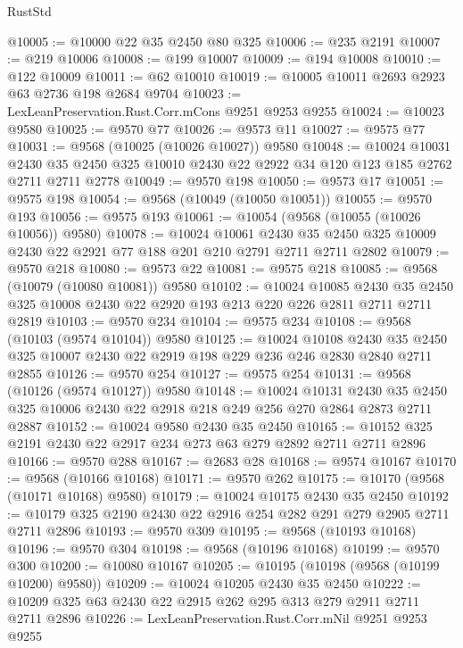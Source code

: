 \begin{lexlean}{RustStd}
\begin{coremodule}
@10005 := @10000 @22 @35 @2450 @80 @325
@10006 := @235 @2191
@10007 := @219 @10006
@10008 := @199 @10007
@10009 := @194 @10008
@10010 := @122 @10009
@10011 := @62 @10010
@10019 := @10005 @10011 @2693 @2923 @63 @2736 @198 @2684 @9704
@10023 := LexLeanPreservation.Rust.Corr.mCons @9251 @9253 @9255
@10024 := @10023 @9580
@10025 := @9570 @77
@10026 := @9573 @11
@10027 := @9575 @77
@10031 := @9568 (@10025 (@10026 @10027)) @9580
@10048 := @10024
    @10031
    @2430
    @35
    @2450
    @325
    @10010
    @2430
    @22
    @2922
    @34
    @120
    @123
    @185
    @2762
    @2711
    @2711
    @2778
@10049 := @9570 @198
@10050 := @9573 @17
@10051 := @9575 @198
@10054 := @9568 (@10049 (@10050 @10051))
@10055 := @9570 @193
@10056 := @9575 @193
@10061 := @10054 (@9568 (@10055 (@10026 @10056)) @9580)
@10078 := @10024
    @10061
    @2430
    @35
    @2450
    @325
    @10009
    @2430
    @22
    @2921
    @77
    @188
    @201
    @210
    @2791
    @2711
    @2711
    @2802
@10079 := @9570 @218
@10080 := @9573 @22
@10081 := @9575 @218
@10085 := @9568 (@10079 (@10080 @10081)) @9580
@10102 := @10024
    @10085
    @2430
    @35
    @2450
    @325
    @10008
    @2430
    @22
    @2920
    @193
    @213
    @220
    @226
    @2811
    @2711
    @2711
    @2819
@10103 := @9570 @234
@10104 := @9575 @234
@10108 := @9568 (@10103 (@9574 @10104)) @9580
@10125 := @10024
    @10108
    @2430
    @35
    @2450
    @325
    @10007
    @2430
    @22
    @2919
    @198
    @229
    @236
    @246
    @2830
    @2840
    @2711
    @2855
@10126 := @9570 @254
@10127 := @9575 @254
@10131 := @9568 (@10126 (@9574 @10127)) @9580
@10148 := @10024
    @10131
    @2430
    @35
    @2450
    @325
    @10006
    @2430
    @22
    @2918
    @218
    @249
    @256
    @270
    @2864
    @2873
    @2711
    @2887
@10152 := @10024 @9580 @2430 @35 @2450
@10165 := @10152 @325 @2191 @2430 @22 @2917 @234 @273 @63 @279 @2892 @2711 @2711 @2896
@10166 := @9570 @288
@10167 := @2683 @28
@10168 := @9574 @10167
@10170 := @9568 (@10166 @10168)
@10171 := @9570 @262
@10175 := @10170 (@9568 (@10171 @10168) @9580)
@10179 := @10024 @10175 @2430 @35 @2450
@10192 := @10179 @325 @2190 @2430 @22 @2916 @254 @282 @291 @279 @2905 @2711 @2711 @2896
@10193 := @9570 @309
@10195 := @9568 (@10193 @10168)
@10196 := @9570 @304
@10198 := @9568 (@10196 @10168)
@10199 := @9570 @300
@10200 := @10080 @10167
@10205 := @10195 (@10198 (@9568 (@10199 @10200) @9580))
@10209 := @10024 @10205 @2430 @35 @2450
@10222 := @10209 @325 @63 @2430 @22 @2915 @262 @295 @313 @279 @2911 @2711 @2711 @2896
@10226 := LexLeanPreservation.Rust.Corr.mNil @9251 @9253 @9255

\end{coremodule}
\end{lexlean}
